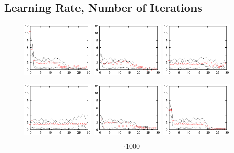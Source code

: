\documentclass{beamer}
\begin{document}
\subsection{Learning Rate, Number of Iterations}
\begin{frame}
	\begin{figure}
		\centering
		\includegraphics[width=3.5cm]{fig/err/e1.eps}
		\includegraphics[width=3.5cm]{fig/err/e2.eps}
		\includegraphics[width=3.5cm]{fig/err/e3.eps}
	\end{figure}
	\begin{figure}
		\includegraphics[width=3.5cm]{fig/err/e4.eps}
		\includegraphics[width=3.5cm]{fig/err/e5.eps}
		\includegraphics[width=3.5cm]{fig/err/e6.eps}
	\end{figure}
        \begin{equation*}
          \cdot1000
        \end{equation*}
\end{frame}
\end{document}
